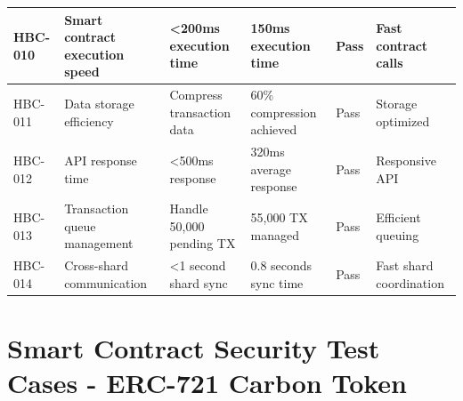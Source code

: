 \documentclass[oneside,a4paper,12pt]{book}
\begin{document}
\begin{longtable}{|p{1.5cm}|p{3.5cm}|p{2.8cm}|p{2.5cm}|p{1.8cm}|p{2.3cm}|}
HBC-010 & Smart contract execution speed & <200ms execution time & 150ms execution time & Pass & Fast contract calls \\
\hline

HBC-011 & Data storage efficiency & Compress transaction data & 60\% compression achieved & Pass & Storage optimized \\
\hline

HBC-012 & API response time & <500ms response & 320ms average response & Pass & Responsive API \\
\hline

HBC-013 & Transaction queue management & Handle 50,000 pending TX & 55,000 TX managed & Pass & Efficient queuing \\
\hline

HBC-014 & Cross-shard communication & <1 second shard sync & 0.8 seconds sync time & Pass & Fast shard coordination \\
\hline

\end{longtable}



\section{Smart Contract Security Test Cases - ERC-721 Carbon Token}
\end{document}
